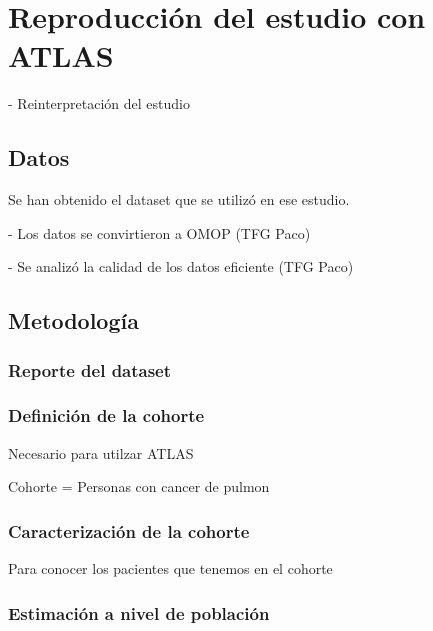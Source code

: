 \section{Reproducción del estudio con ATLAS} \label{sec:08atlas}


- Reinterpretación del estudio

\subsection{Datos}


Se han obtenido el dataset que se utilizó en ese estudio.

- Los datos se convirtieron a OMOP (TFG Paco)

- Se analizó la calidad de los datos eficiente (TFG Paco)

\subsection{Metodología}

\subsubsection{Reporte del dataset}

\subsubsection{Definición de la cohorte}

Necesario para utilzar ATLAS

Cohorte = Personas con cancer de pulmon

\subsubsection{Caracterización de la cohorte}

Para conocer los pacientes que tenemos en el cohorte

\subsubsection{Estimación a nivel de población}

